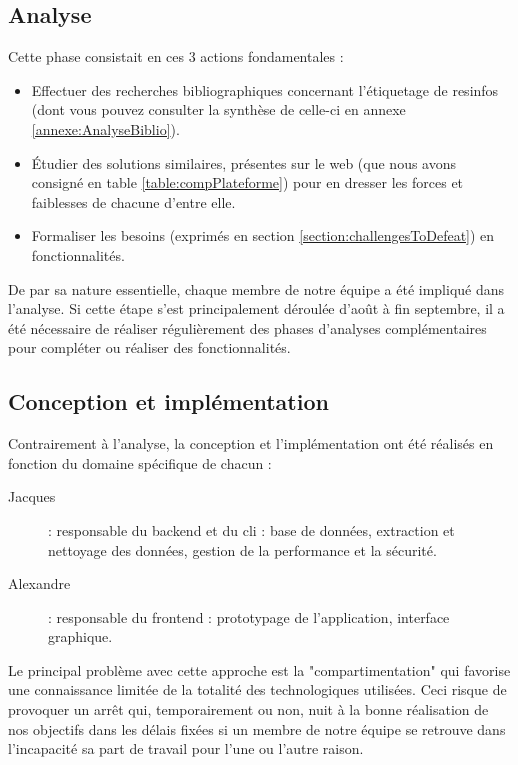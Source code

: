 \subsection*{Analyse}

Cette phase consistait en ces 3 actions fondamentales :
\begin{itemize}
    \item Effectuer des recherches bibliographiques concernant l'étiquetage de \glspl{resinfo} (dont vous pouvez consulter la synthèse de celle-ci en annexe \ref{annexe:AnalyseBiblio}).
    \item Étudier des solutions similaires, présentes sur le web (que nous avons consigné en table \ref{table:compPlateforme}) pour en dresser les forces et faiblesses de chacune d'entre elle.
    \item Formaliser les besoins (exprimés en section \ref{section:challengesToDefeat}) en fonctionnalités.
\end{itemize}

De par sa nature essentielle, chaque membre de notre équipe a été impliqué dans l'analyse. Si cette étape s'est principalement déroulée d'août à fin septembre, il a été nécessaire de réaliser régulièrement des phases d'analyses complémentaires pour compléter ou réaliser des fonctionnalités.

\subsection*{Conception et implémentation}

Contrairement à l'analyse, la conception et l'implémentation ont été réalisés en fonction du domaine spécifique de chacun : 

\begin{description}
    \item[Jacques] : responsable du \Gls{backend} et du \Gls{cli} : base de données, extraction et nettoyage des données, gestion de la performance et la sécurité.
    \item[Alexandre] : responsable du \Gls{frontend} : prototypage de l'application, interface graphique.
\end{description}

Le principal problème avec cette approche est la "compartimentation" qui favorise une connaissance limitée de la totalité des technologiques utilisées. Ceci risque de provoquer un arrêt qui, temporairement ou non, nuit à la bonne réalisation de nos objectifs dans les délais fixées si un membre de notre équipe se retrouve dans l'incapacité sa part de travail pour l'une ou l'autre raison. \\

